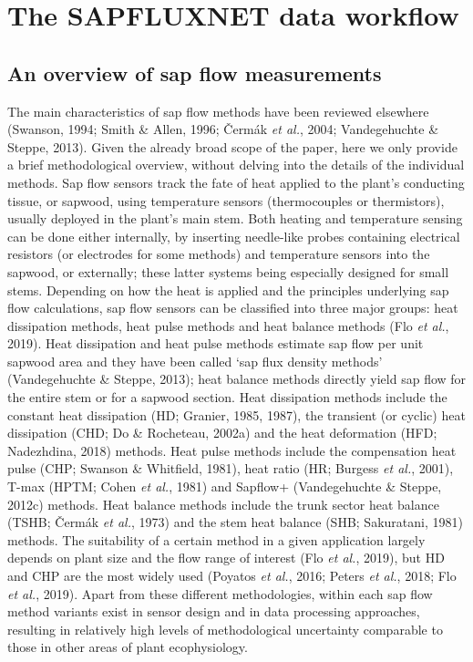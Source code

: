 \documentclass[11pt,twoside]{reedthesis}
\begin{document}
\vspace*{\fill}

\section{The SAPFLUXNET data
workflow}\label{the-sapfluxnet-data-workflow}

\subsection{An overview of sap flow
measurements}\label{an-overview-of-sap-flow-measurements}

The main characteristics of sap flow methods have been reviewed
elsewhere (Swanson, 1994; Smith \& Allen, 1996; Čermák \emph{et al.},
2004; Vandegehuchte \& Steppe, 2013). Given the already broad scope of
the paper, here we only provide a brief methodological overview, without
delving into the details of the individual methods. Sap flow sensors
track the fate of heat applied to the plant's conducting tissue, or
sapwood, using temperature sensors (thermocouples or thermistors),
usually deployed in the plant's main stem. Both heating and temperature
sensing can be done either internally, by inserting needle-like probes
containing electrical resistors (or electrodes for some methods) and
temperature sensors into the sapwood, or externally; these latter
systems being especially designed for small stems. Depending on how the
heat is applied and the principles underlying sap flow calculations, sap
flow sensors can be classified into three major groups: heat dissipation
methods, heat pulse methods and heat balance methods (Flo \emph{et al.},
2019). Heat dissipation and heat pulse methods estimate sap flow per
unit sapwood area and they have been called `sap flux density methods'
(Vandegehuchte \& Steppe, 2013); heat balance methods directly yield sap
flow for the entire stem or for a sapwood section. Heat dissipation
methods include the constant heat dissipation (HD; Granier, 1985, 1987),
the transient (or cyclic) heat dissipation (CHD; Do \& Rocheteau, 2002a)
and the heat deformation (HFD; Nadezhdina, 2018) methods. Heat pulse
methods include the compensation heat pulse (CHP; Swanson \& Whitfield,
1981), heat ratio (HR; Burgess \emph{et al.}, 2001), T-max (HPTM; Cohen
\emph{et al.}, 1981) and Sapflow+ (Vandegehuchte \& Steppe, 2012c)
methods. Heat balance methods include the trunk sector heat balance
(TSHB; Čermák \emph{et al.}, 1973) and the stem heat balance (SHB;
Sakuratani, 1981) methods. The suitability of a certain method in a
given application largely depends on plant size and the flow range of
interest (Flo \emph{et al.}, 2019), but HD and CHP are the most widely
used (Poyatos \emph{et al.}, 2016; Peters \emph{et al.}, 2018; Flo
\emph{et al.}, 2019). Apart from these different methodologies, within
each sap flow method variants exist in sensor design and in data
processing approaches, resulting in relatively high levels of
methodological uncertainty comparable to those in other areas of plant
ecophysiology.\par
\end{document}
